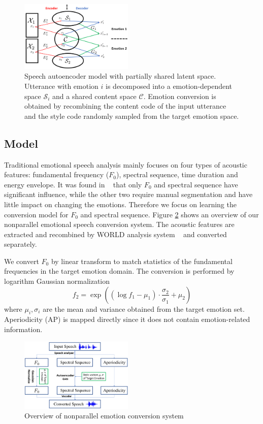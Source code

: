 \documentclass{article}
\begin{document}
\begin{figure}[htb]
\includegraphics[width=0.48\textwidth]{FIG/autoencoder}
\caption{Speech autoencoder model with partially shared latent space. Utterance with emotion $i$ is decomposed into a emotion-dependent space $\mathcal{S}_i$ and a shared content space $\mathcal{C}$. Emotion conversion is obtained by recombining the content code of the input utterance and the style code randomly sampled from the target emotion space.}
\label{autoencoder}
\end{figure}


\subsection{Model}
Traditional emotional speech analysis mainly focuses on four types of acoustic features: fundamental frequency ($F_0$), spectral sequence, time duration and energy envelope. It was found in ~\cite{xue2018voice} that only $F_0$ and spectral sequence have significant influence, while the other two require manual segmentation and have little impact on changing the emotions. Therefore we focus on learning the conversion model for $F_0$ and spectral sequence. Figure \ref{model} shows an overview of our nonparallel emotional speech conversion system. The acoustic features are extracted and recombined by WORLD analysis system ~\cite{morise2016world} and converted separately.

We convert $F_0$ by linear transform to match statistics of the fundamental frequencies in the target emotion domain. The conversion is performed by logarithm Gaussian normalization
\begin{equation}
f_2 = \exp((\log f_1 - \mu_1)\cdot\frac{\sigma_2}{\sigma_1} + \mu_2)
\label{eq:f0}
\end{equation}
where $\mu_i, \sigma_i$ are the mean and variance obtained from the target emotion set. Aperiodicity (AP) is mapped directly since it does not contain emotion-related information.

\begin{figure}[htb]
\includegraphics[width=0.48\textwidth]{FIG/model}
\caption{Overview of nonparallel emotion conversion system}
\label{model}
\end{figure}
\end{document}
